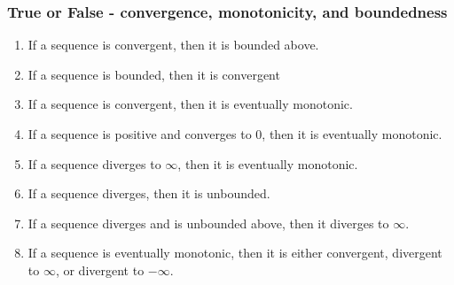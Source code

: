 \begin{frame}[t]
	\fontsize{13}{13}\selectfont
	\frametitle{\fontsize{13}{13}\selectfont True or False - convergence,
	monotonicity, and boundedness}

	\begin{enumerate}
		\item If a sequence is convergent, then it is bounded above.

		\item If a sequence is bounded, then it is convergent

		\item If a sequence is convergent, then it is eventually monotonic.

		\item If a sequence is positive and converges to 0, then it is eventually
			monotonic.

		\item If a sequence diverges to $\infty$, then it is eventually monotonic.

		\item If a sequence diverges, then it is unbounded.

		\item If a sequence diverges and is unbounded above, then it diverges to
			$\infty$.

		\item If a sequence is eventually monotonic, then it is either convergent, divergent
			to $\infty$, or divergent to $-\infty$.
	\end{enumerate}
\end{frame}

